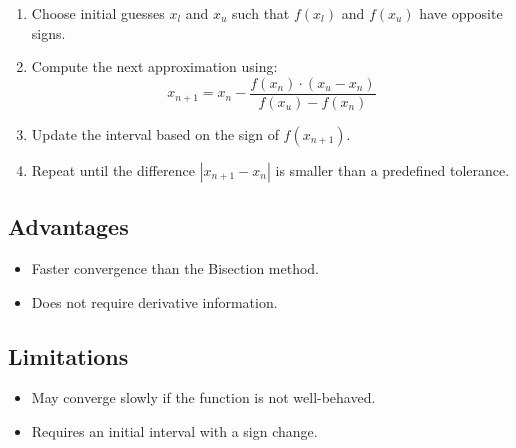 \documentclass{scrreprt}
\begin{document}
\begin{enumerate}
    \item Choose initial guesses \( x_l \) and \( x_u \) such that \( f(x_l) \) and \( f(x_u) \) have opposite signs.
    \item Compute the next approximation using:
    \begin{equation}
    x_{n+1} = x_n - \frac{f(x_n) \cdot (x_u - x_n)}{f(x_u) - f(x_n)}
    \end{equation}
    \item Update the interval based on the sign of \( f(x_{n+1}) \).
    \item Repeat until the difference \( |x_{n+1} - x_n| \) is smaller than a predefined tolerance.
\end{enumerate}

\subsection*{Advantages}

\begin{itemize}
    \item Faster convergence than the Bisection method.
    \item Does not require derivative information.
\end{itemize}

\subsection*{Limitations}

\begin{itemize}
    \item May converge slowly if the function is not well-behaved.
    \item Requires an initial interval with a sign change.
\end{itemize}
\end{document}
